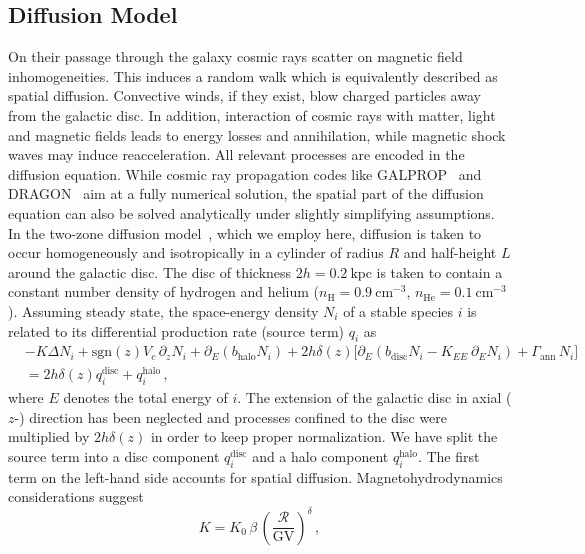 \documentclass[a4paper,11pt]{article}
\newcommand{\kpc}{\:\text{kpc}}
\newcommand{\cm}{\:\text{cm}}
\begin{document}
\subsection{Diffusion Model}\label{sec:diffusionmodel}
On their passage through the galaxy cosmic rays scatter on magnetic field inhomogeneities. This induces a random walk which is equivalently described as spatial diffusion. Convective winds, if they exist, blow charged particles away from the galactic disc. In addition, interaction of cosmic rays with matter, light and magnetic fields leads to energy losses and annihilation, while magnetic shock waves may induce reacceleration. All relevant processes are encoded in the diffusion equation. While cosmic ray propagation codes like GALPROP~\cite{Moskalenko:1997gh,Strong:1998pw,Strong:2001gh} and DRAGON~\cite{Evoli:2008dv,Evoli:2017vim} aim at a fully numerical solution, the spatial part of the diffusion equation can also be solved analytically under slightly simplifying assumptions. In the two-zone diffusion model~\cite{Maurin:2001sj,Donato:2001ms,Maurin:2002ua}, which we employ here, diffusion is taken to occur homogeneously and isotropically in a cylinder of radius $R$ and half-height $L$ around the galactic disc. The disc of thickness $2h=0.2\kpc$ is taken to contain a constant number density of hydrogen and helium ($n_{\text{H}}=0.9\cm^{-3}$, $n_{\text{He}}=0.1\cm^{-3}$). Assuming steady state, the space-energy density $N_i$ of a stable species $i$ is related to its differential production rate (source term) $q_i$ as
\begin{align}\label{eq:diffeq}
&  -K \Delta N_i + \text{sgn$(z)$} V_c \,\partial_z N_i + \partial_E (b_{\text{halo}} N_i)  + 2 h \delta(z) \big[\partial_E (b_{\text{disc}}  N_i -K_{EE} \:\partial_E N_{i})+ \Gamma_\text{ann}\,N_{i}\big] \nonumber\\
& =2h\delta(z)q_i^{\text{disc}} + q_i^{\text{halo}}\,,
\end{align}
where $E$ denotes the total energy of $i$. The extension of the galactic disc in axial ($z$-) direction has been neglected and processes confined to the disc were multiplied by $2 h \delta(z)$ in order to keep proper normalization. We have split the source term into a disc component $q_i^{\text{disc}}$ and a halo component $q_i^{\text{halo}}$. The first term on the left-hand side accounts for spatial diffusion. Magnetohydrodynamics considerations suggest~\cite{Ptuskin:1997aa}
\begin{equation}\label{eq:standarddiffusion}
 K = K_0 \,\beta \,\left(\frac{\mathcal{R}}{\text{GV}}\right)^\delta\,,
\end{equation}
\end{document}
